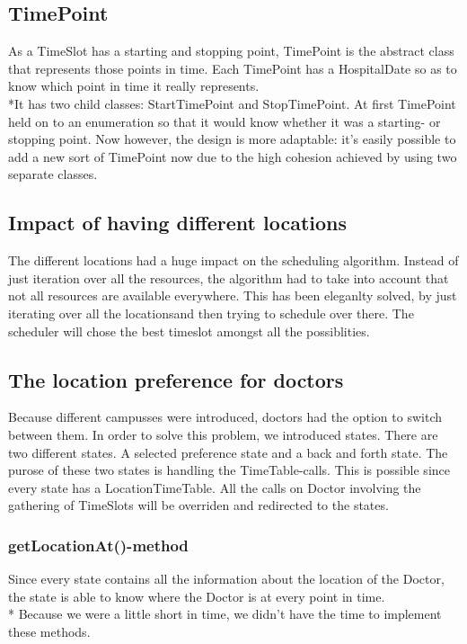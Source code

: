 \documentclass[12pt]{article}
\begin{document}
\subsection{TimePoint}
As a TimeSlot has a starting and stopping point, TimePoint is the abstract class that represents those points in time. Each TimePoint has a HospitalDate so as to know which point in time it really represents.
\\*It has two child classes: StartTimePoint and StopTimePoint. At first TimePoint held on to an enumeration so that it would know whether it was a starting- or stopping point. Now however, the design is more adaptable: it's easily possible to add a new sort of TimePoint now due to the high cohesion achieved by using two separate classes.

\subsection{Impact of having different locations}
The different locations had a huge impact on the scheduling algorithm. Instead of just iteration over all the resources, the algorithm had to take into account that not all resources are available everywhere. This has been eleganlty solved, by just iterating over all the locationsand then trying to schedule over there. The scheduler will chose the best timeslot amongst all the possiblities.
\subsection{The location preference for doctors}
Because different campusses were introduced, doctors had the option to switch between them. In order to solve this problem, we introduced states. There are two different states. A selected preference state and a back and forth state. The purose of these two states is handling the TimeTable-calls. This is possible since every state has a LocationTimeTable. All the calls on Doctor involving the gathering of TimeSlots will be overriden and redirected to the states.
\subsubsection{getLocationAt()-method}
Since every state contains all the information about the location of the Doctor, the state is able to know where the Doctor is at every point in time.\\*
Because we were a little short in time, we didn't have the time to implement these methods.
\end{document}
